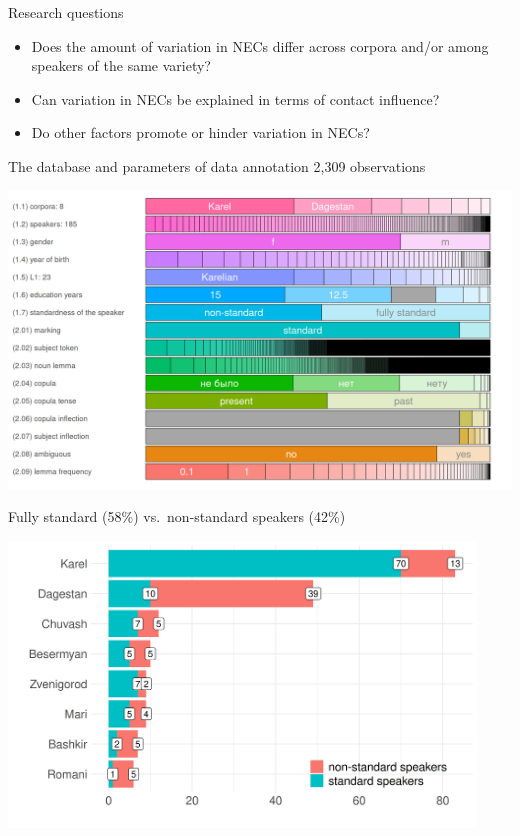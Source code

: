 \documentclass[
  ignorenonframetext,
  t]{beamer}
\providecommand{\tightlist}{%
  \setlength{\itemsep}{0pt}\setlength{\parskip}{0pt}}\usepackage{longtable,booktabs,array}
\begin{document}
\begin{frame}{Research questions}
\label{research-questions-1}
\begin{itemize}
\tightlist
\item
  Does the amount of variation in NECs differ across corpora and/or
  among speakers of the same variety?
\item
  Can variation in NECs be explained in terms of contact influence?
\item
  Do other factors promote or hinder variation in NECs?
\end{itemize}
\end{frame}

\begin{frame}{The database and parameters of data annotation}
\label{the-database-and-parameters-of-data-annotation-1}
2,309 observations

\begin{center}
\includegraphics[width=1.05\textwidth,height=\textheight]{images/l2_neg_exist_constr_df_structure.png}
\end{center}
\end{frame}

\begin{frame}{Fully standard (58\%) vs.~non-standard speakers (42\%)}
\label{fully-standard-58-vs.-non-standard-speakers-42}
\begin{center}
\includegraphics[width=0.93\textwidth,height=\textheight]{images/l2_neg_exist_constr_distribution_of_speakers_by_standardness_across_corpora.png}
\end{center}
\end{frame}
\end{document}

